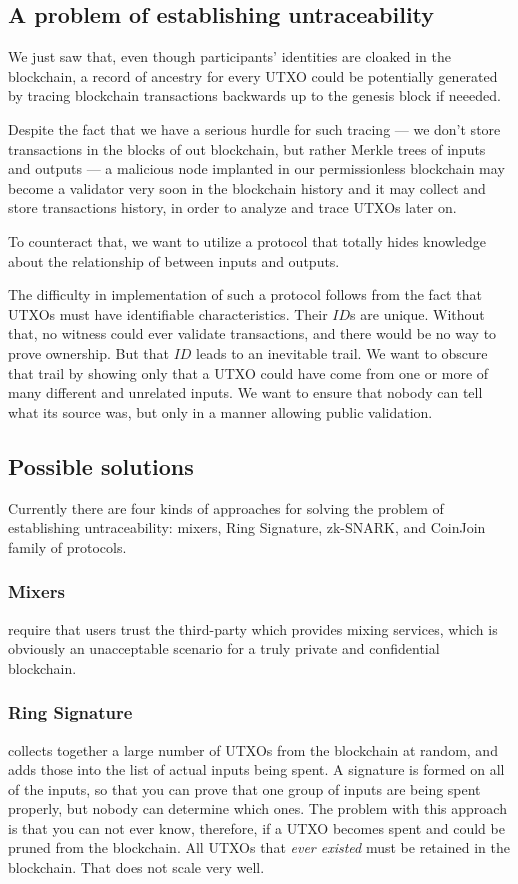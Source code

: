 \documentclass[a4paper, 10pt, conference]{ieeeconf}
\begin{document}
\subsection{A problem of establishing untraceability}
We just saw that, even though participants' identities are cloaked in the blockchain, a record of ancestry for every UTXO could be potentially generated by tracing blockchain transactions backwards up to the genesis block if neeeded.

Despite the fact that we have a serious hurdle for such tracing --- we don't store transactions in the blocks of out blockchain, but rather Merkle trees of inputs and outputs --- a malicious node implanted in our permissionless blockchain may become a validator very soon in the blockchain history and it may collect and store transactions history, in order to analyze and trace UTXOs later on.

To counteract that, we want to utilize a protocol that totally hides knowledge about the relationship of between inputs and outputs.

The difficulty in implementation of such a protocol follows from the fact that UTXOs must have identifiable characteristics. Their $ID$s are unique. Without that, no witness could ever validate transactions, and there would be no way to prove ownership. But that $ID$ leads to an inevitable trail. We want to obscure that trail by showing only that a UTXO could have come from one or more of many different and unrelated inputs. We want to ensure that nobody can tell what its source was, but only in a manner allowing public validation.

\subsection{Possible solutions}
Currently there are four kinds of approaches for solving the problem of establishing untraceability: mixers, Ring Signature, zk-SNARK, and CoinJoin family of protocols.

\subsubsection{Mixers} require that users trust the third-party which provides mixing services, which is obviously an unacceptable scenario for a truly private and confidential blockchain.

\subsubsection{Ring Signature} collects together a large number of UTXOs from the blockchain at random, and adds those into the list of actual inputs being spent. A signature is formed on all of the inputs, so that you can prove that one group of inputs are being spent properly, but nobody can determine which ones. The problem with this approach is that you can not ever know, therefore, if a UTXO becomes spent and could be pruned from the blockchain. All UTXOs that \textit{ever existed} must be retained in the blockchain. That does not scale very well.
\end{document}
